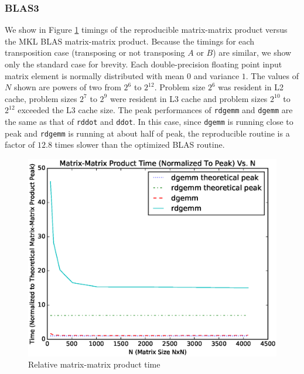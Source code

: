   \subsubsection{BLAS3}
    We show in Figure \ref{fig:gemm_timings} timings of the reproducible matrix-matrix product versus the MKL BLAS matrix-matrix product. Because the timings for each transposition case (transposing or not transposing $A$ or $B$) are similar, we show only the standard case for brevity. Each double-precision floating point input matrix element is normally distributed with mean $0$ and variance $1$. The values of $N$ shown are powers of two from $2^6$ to $2^{12}$. Problem size $2^6$ was resident in L2 cache, problem sizes $2^7$ to $2^9$ were resident in L3 cache and problem sizes $2^{10}$ to $2^{12}$ exceeded the L3 cache size. The peak performances of \texttt{rdgemm} and \texttt{dgemm} are the same as that of \texttt{rddot} and \texttt{ddot}. In this case, since \texttt{dgemm} is running close to peak and \texttt{rdgemm} is running at about half of peak, the reproducible routine is a factor of $12.8$ times slower than the optimized BLAS routine.
  \begin{figure}[H]
  \begin{center}
  \includegraphics[width=\textwidth]{plots/gemm_comparison}
  \caption{Relative matrix-matrix product time}
  \label{fig:gemm_timings}
  \end{center}
  \end{figure}
